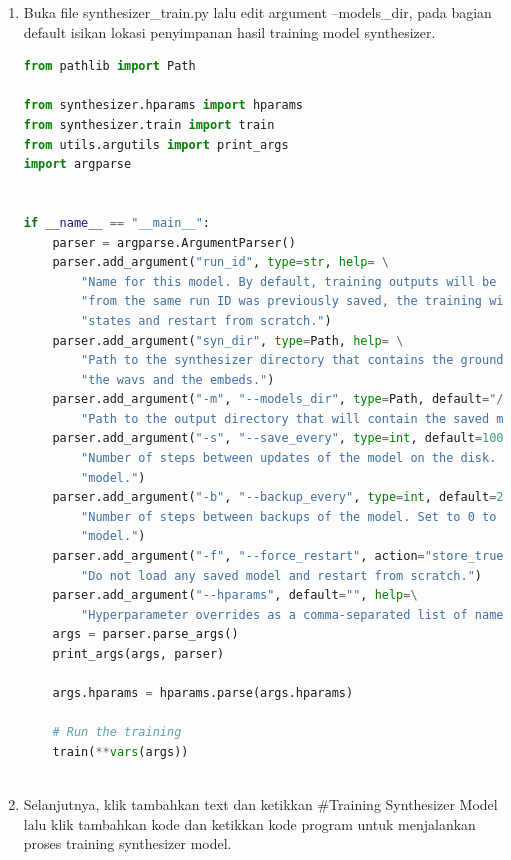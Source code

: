 \begin{enumerate}
\item Buka file synthesizer\_train.py lalu edit argument --models\_dir, pada bagian default isikan lokasi penyimpanan hasil training model synthesizer.

\begin{lstlisting}[language=Python, caption=Training Speaker Encoder Model]
from pathlib import Path

from synthesizer.hparams import hparams
from synthesizer.train import train
from utils.argutils import print_args
import argparse


if __name__ == "__main__":
    parser = argparse.ArgumentParser()
    parser.add_argument("run_id", type=str, help= \
        "Name for this model. By default, training outputs will be stored to saved_models/<run_id>/. If a model state "
        "from the same run ID was previously saved, the training will restart from there. Pass -f to overwrite saved "
        "states and restart from scratch.")
    parser.add_argument("syn_dir", type=Path, help= \
        "Path to the synthesizer directory that contains the ground truth mel spectrograms, "
        "the wavs and the embeds.")
    parser.add_argument("-m", "--models_dir", type=Path, default="/content/drive/MyDrive/ColabNotebooks/Real-Time-Voice-Cloning/synthesizer/saved_models", help=\
        "Path to the output directory that will contain the saved model weights and the logs.")
    parser.add_argument("-s", "--save_every", type=int, default=1000, help= \
        "Number of steps between updates of the model on the disk. Set to 0 to never save the "
        "model.")
    parser.add_argument("-b", "--backup_every", type=int, default=25000, help= \
        "Number of steps between backups of the model. Set to 0 to never make backups of the "
        "model.")
    parser.add_argument("-f", "--force_restart", action="store_true", help= \
        "Do not load any saved model and restart from scratch.")
    parser.add_argument("--hparams", default="", help=\
        "Hyperparameter overrides as a comma-separated list of name=value pairs")
    args = parser.parse_args()
    print_args(args, parser)

    args.hparams = hparams.parse(args.hparams)

    # Run the training
    train(**vars(args))
    
\end{lstlisting}

\item Selanjutnya, klik tambahkan text dan ketikkan \#Training Synthesizer Model lalu klik tambahkan kode dan ketikkan kode program untuk menjalankan proses training synthesizer model. 


\end{enumerate}
